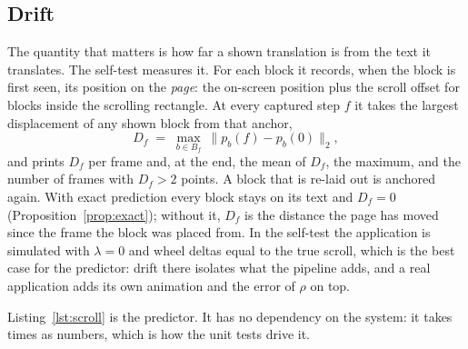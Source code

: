 \subsection{Drift}

The quantity that matters is how far a shown translation is from the text it translates. The self-test measures it. For each block it records, when the
block is first seen, its position on the \emph{page}: the on-screen position plus the scroll offset for blocks inside the scrolling rectangle. At
every captured step $f$ it takes the largest displacement of any shown block from that anchor,
\begin{equation}\label{eq:drift}
D_f\;=\;\max_{b\in B_f}\ \bigl\|p_b(f)-p_b(0)\bigr\|_2,
\end{equation}
and prints $D_f$ per frame and, at the end, the mean of $D_f$, the maximum, and the number of frames with $D_f>2$ points. A block that is re-laid out is
anchored again. With exact prediction every block stays on its text and $D_f=0$ (Proposition~\ref{prop:exact}); without it, $D_f$ is the distance the page has moved since the frame the block was placed from. In the
self-test the application is simulated with $\lambda=0$ and wheel deltas equal to the true scroll, which is the best case for the predictor: drift there isolates what the pipeline adds, and a real application
adds its own animation and the error of $\rho$ on top.

Listing~\ref{lst:scroll} is the predictor. It has no dependency on the system: it takes times as numbers, which is how the unit tests drive it.

\begin{listing*}[t]

\caption{The core of , \texttt{Core/Sources/MwoyeoCore/ScrollPredictor.swift}, lines 31--68 (,
, , , ), as it is in the repository.  is Eq.~(\ref{eq:shown}),
 Eq.~(\ref{eq:units}),  Eq.~(\ref{eq:offset}) and  Eq.~(\ref{eq:confirm}).}\label{lst:scroll}
\end{listing*}
